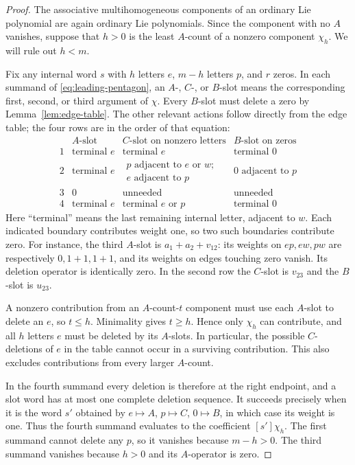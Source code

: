 \documentclass[11pt]{article}
\theoremstyle{definition}
\theoremstyle{remark}
\numberwithin{equation}{section}
\begin{document}
\begin{proof}
The associative multihomogeneous components of an ordinary Lie
polynomial are again ordinary Lie polynomials.  Since the component
with no $A$ vanishes, suppose that $h>0$ is the least $A$-count of a
nonzero component $\chi_h$.  We will rule out $h<m$.

Fix any internal word $s$ with $h$ letters $e$, $m-h$ letters $p$, and
$r$ zeros.  In each summand of \eqref{eq:leading-pentagon}, an
$A$-, $C$-, or $B$-slot means the corresponding first, second, or third
argument of $\chi$.  Every $B$-slot must delete a zero by
Lemma~\ref{lem:edge-table}.  The other relevant actions follow directly
from the edge table; the four rows are in the order of that equation:
\begin{equation}\label{eq:deletion-slot-actions}
\begin{array}{c|c|c|c}
 &A\text{-slot}&C\text{-slot on nonzero letters}&B\text{-slot on zeros}\\ \hline
1&\text{terminal }e&\text{terminal }e&\text{terminal }0\\
2&\text{terminal }e&
 \substack{p\text{ adjacent to }e\text{ or }w;\\
             e\text{ adjacent to }p}&0\text{ adjacent to }p\\
3&0&\text{unneeded}&\text{unneeded}\\
4&\text{terminal }e&\text{terminal }e\text{ or }p&\text{terminal }0
\end{array}
\end{equation}
Here ``terminal'' means the last remaining internal letter, adjacent to
$w$.  Each indicated boundary contributes weight one, so two such
boundaries contribute zero.  For instance, the third $A$-slot is
$a_1+a_2+v_{12}$: its weights on $ep,ew,pw$ are respectively
$0,1+1,1+1$, and its weights on edges touching zero vanish.  Its deletion
operator is identically zero.  In the second row the $C$-slot is
$v_{23}$ and the $B$-slot is $u_{23}$.

A nonzero contribution from an $A$-count-$t$ component must use each
$A$-slot to delete an $e$, so $t\leq h$.  Minimality gives $t\geq h$.
Hence only $\chi_h$ can contribute, and all $h$ letters $e$ must be
deleted by its $A$-slots.  In particular, the possible $C$-deletions of
$e$ in the table cannot occur in a surviving contribution.  This also
excludes contributions from every larger $A$-count.

In the fourth summand every deletion is therefore at the right
endpoint, and a slot word has at most one complete deletion sequence.
It succeeds precisely when it is the word $s'$ obtained by
$e\mapsto A$, $p\mapsto C$, $0\mapsto B$, in which case its weight is
one.  Thus the fourth summand evaluates to the coefficient $[s']\chi_h$.
The first summand cannot delete any $p$, so it vanishes because
$m-h>0$.  The third summand vanishes because $h>0$ and its $A$-operator
is zero.


\end{proof}
\end{document}
